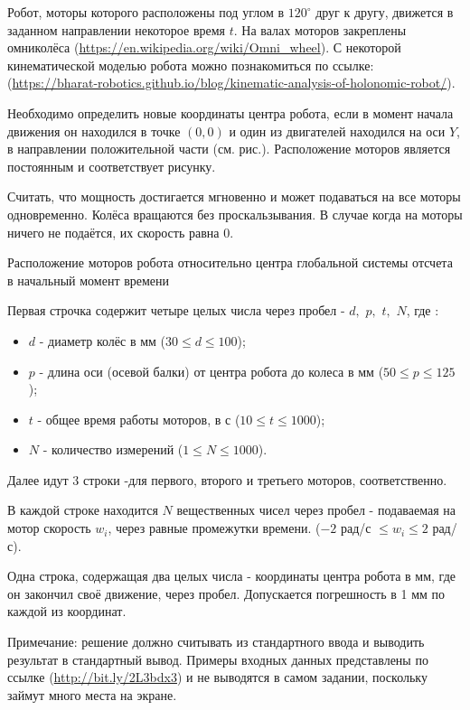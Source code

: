 
Робот, моторы которого расположены под углом в $120^{\circ}$ друг к другу, движется в заданном направлении 
некоторое время $t$. На валах моторов закреплены омниколёса (\url{https://en.wikipedia.org/wiki/Omni_wheel}). 
С некоторой кинематической моделью робота можно познакомиться по ссылке: (\url{https://bharat-robotics.github.io/blog/kinematic-analysis-of-holonomic-robot/}).

Необходимо определить новые координаты центра робота, если в момент начала движения он находился в точке 
$(0,0)$ и один из двигателей находился на оси $Y$, в направлении положительной части (см. рис.). 
Расположение моторов является постоянным и соответствует рисунку.

Считать, что мощность достигается мгновенно и может подаваться на все моторы одновременно. 
Колёса вращаются без проскальзывания. В случае когда на моторы ничего не подаётся, их скорость равна $0$.


Расположение моторов робота относительно центра глобальной системы отсчета в начальный момент времени

 
Первая строчка содержит четыре целых числа через пробел - $d,$ $p,$ $t,$ $N$, где :

\begin{itemize}
    \item $d$ - диаметр колёс в мм ($30 \leq d \leq 100$);
    \item $p$ - длина оси (осевой балки) от центра робота до колеса в мм ($ 50 \leq p \leq 125$);
    \item $t$ - общее время работы моторов, в с ($10 \leq t \leq 1000$);
    \item $N$ - количество измерений ($1 \leq N \leq 1000$).
\end{itemize}

Далее идут $3$ строки -для первого, второго и третьего моторов, соответственно.

В каждой строке находится $N$ вещественных чисел через пробел - подаваемая на мотор скорость $w_i$, через равные промежутки времени. ($-2$ рад/с $\leq w_i \leq 2$ рад/с).

\outputfmtSection

Одна строка, содержащая два целых числа - координаты центра робота в мм, где он закончил своё движение, через пробел. Допускается погрешность в 1 мм по каждой из координат.

Примечание: решение должно считывать из стандартного ввода и выводить результат в стандартный вывод. 
Примеры входных данных представлены по ссылке (\url{http://bit.ly/2L3bdx3}) и не выводятся в самом задании, поскольку займут много места на экране.

